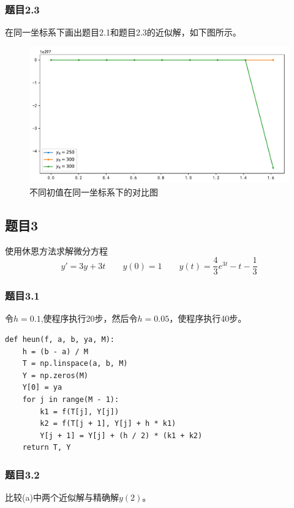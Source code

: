 \subsubsection{题目2.3}

在同一坐标系下画出题目2.1和题目2.3的近似解，如下图所示。

\begin{figure}[H]
	\centering
	\caption{不同初值在同一坐标系下的对比图}
	\includegraphics[width=\linewidth]{fig33.pdf}
\end{figure}

\subsection{题目3}

使用休恩方法求解微分方程
$$y'=3y+3t\qquad y(0)=1\qquad y(t)=\frac{4}{3}e^{3t}-t-\frac{1}{3}$$

\subsubsection{题目3.1}

令$h=0.1$,使程序执行20步，然后令$h=0.05$，使程序执行40步。

\begin{verbatim}
def heun(f, a, b, ya, M):
    h = (b - a) / M
    T = np.linspace(a, b, M)
    Y = np.zeros(M)
    Y[0] = ya
    for j in range(M - 1):
        k1 = f(T[j], Y[j])
        k2 = f(T[j + 1], Y[j] + h * k1)
        Y[j + 1] = Y[j] + (h / 2) * (k1 + k2)
    return T, Y
\end{verbatim}

\subsubsection{题目3.2}

比较(a)中两个近似解与精确解$y(2)$。

